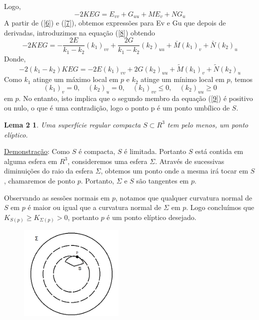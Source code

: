 \documentclass[blue]{beamer}
\newtheorem{lem2}{Lema 2}
\begin{document}
\begin{frame}
\justifying
\hspace{0.2cm}Logo,
\begin{equation}
-2KEG=E_{vv}+G_{uu}+ME_{v}+NG_u \label{8}
\end{equation}
\hspace{0.2cm}A partir de (\ref{6}) e (\ref{7}), obtemos expressões para Ev e Gu que depois de derivadas, introduzimos na equação (\ref{8}) obtendo
$$-2KEG=-\frac{2E}{k_1-k_2}(k_1)_{vv}+\frac{2G}{k_1-k_2}(k_2)_{uu}+\bar{M}(k_1)_v+\bar{N}(k_2)_u $$
Donde, 
\begin{equation}
-2(k_1-k_2)KEG=-2E(k_1)_{vv}+2G(k_2)_{uu}+\tilde{M}(k_1)_v+\tilde{N}(k_2)_u \label{9}
\end{equation}
\hspace{0.2cm}Como $k_1$ atinge um máximo local em $p$ e $k_2$ atinge um mínimo local em $p$, temos
$$(k_1)_v=0, \quad (k_2)_u=0, \quad (k_1)_{vv} \leq 0, \quad (k_2)_{uu} \geq 0 $$
em $p$. No entanto, isto implica que o segundo membro da equação (\ref{9})  é positivo ou nulo, o que é uma contradição, logo o ponto p é um ponto umbílico de $S$.
\end{frame}

\begin{frame}
\justifying
\begin{lem2}
	Uma superfície regular compacta $S \subset R^3$ tem pelo menos, um ponto elíptico.
\end{lem2}
\underline{Demonstração}: Como $S$ é compacta, $S$ é limitada. Portanto $S$ está contida em alguma esfera em $R^3$, consideremos uma esfera $\Sigma$. Através de sucessivas diminuições do raio da esfera $\Sigma$, obtemos um ponto onde a mesma irá tocar em $S$, chamaremos de ponto $p$. Portanto, $\Sigma$ e $S$ são tangentes em $p$. 
\end{frame}

\begin{frame}
\justifying
\hspace{0.2cm}Observando as sessões normais em $p$, notamos que qualquer curvatura normal de $S$ em $p$ é maior ou igual que a curvatura normal de $\Sigma$ em $p$. Logo concluímos que $K_{S(p)} \geq K_{\Sigma(p)} > 0$, portanto $p$ é um ponto elíptico desejado.
\begin{figure}[ht!]
	\centering
	\includegraphics[width=5cm]{Img3.png}
\end{figure}
\end{frame}
\end{document}
